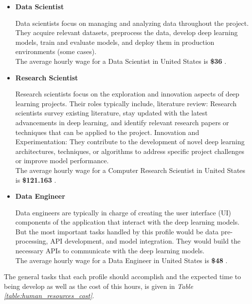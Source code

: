 \begin{itemize}
    \item \textbf{Data Scientist}

Data scientists focus on managing and analyzing data throughout the project. They acquire relevant datasets, preprocess the data, develop deep learning models, train and evaluate models, and deploy them in production environments (some cases). \\

The average hourly wage for a Data Scientist in United States is \textbf{\$36} \cite{SalaryDataScientist}. \\

\item \textbf{Research Scientist}

Research scientists focus on the exploration and innovation aspects of deep learning projects. Their roles typically include, literature review: Research scientists survey existing literature, stay updated with the latest advancements in deep learning, and identify relevant research papers or techniques that can be applied to the project. Innovation and Experimentation: They contribute to the development of novel deep learning architectures, techniques, or algorithms to address specific project challenges or improve model performance. \\

The average hourly wage for a Computer Research Scientist in United States is \textbf{\$121.163} \cite{SalaryResearchScientist}. \\

\item \textbf{Data Engineer}

Data engineers are typically in charge of creating the user interface (UI) components of the application that interact with the deep learning models. But the most important tasks handled by this profile would be data pre-processing, API development, and model integration. They would build the necessary APIs to communicate with the deep learning models. \\

The average hourly wage for a Data Engineer in United States is \textbf{\$48} \cite{SalaryDataEnginner}. \\

\end{itemize}

The general tasks that each profile should accomplish and the expected time to being develop as well
as the cost of this hours,
is given in \textit{Table \ref{table:human_resources_cost}}.

